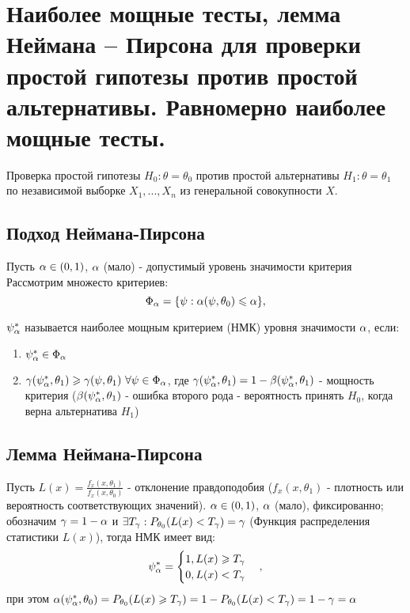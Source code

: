 \section{Наиболее мощные тесты, лемма Неймана – Пирсона для проверки простой гипотезы против простой
альтернативы. Равномерно наиболее мощные тесты.}

Проверка простой гипотезы $H_0 : \theta = \theta_0$ против простой альтернативы $H_1 : \theta = \theta_1$ по независимой выборке $X_1, ..., X_n$ из генеральной совокупности $X$.

\subsection{Подход Неймана-Пирсона}
Пусть $\alpha \in (0, 1)$, $\alpha$ (мало) - допустимый уровень значимости критерия
Рассмотрим множесто критериев:
\[
  \Phi_{\alpha} = \{ \psi : \alpha(\psi, \theta_0) \leqslant \alpha \}\\
,\]

\begin{definition}
  $\psi_{\alpha}^{*}$ называется наиболее мощным критерием (НМК) уровня значимости $\alpha$, если:
  \begin{enumerate}
    \item $\psi_{\alpha}^{*} \in \Phi_{\alpha}$
    \item $\gamma(\psi_{\alpha}^{*}, \theta_1) \geqslant \gamma(\psi, \theta_1)~\forall \psi \in \Phi_{\alpha}$,
      где $\gamma(\psi_{\alpha}^{*}, \theta_1) = 1 - \beta(\psi_{\alpha}^{*}, \theta_1)$ - мощность критерия ($\beta(\psi_{\alpha}^{*}, \theta_1)$ - ошибка второго рода - вероятность принять $H_0$, когда верна альтернатива $H_1$)
  \end{enumerate}
\end{definition}

\subsection{Лемма Неймана-Пирсона}

Пусть $L(x) = \frac{f_x(x, \theta_1)}{f_x(x, \theta_0)}$ - отклонение правдоподобия ($f_x(x, \theta_1)$ - плотность или вероятность соответствующих значений).
$\alpha \in (0, 1)$, $\alpha$ (мало), фиксированно; обозначим $\gamma = 1 - \alpha$ и $\exists T_{\gamma}: P_{\theta_0}(L(x) < T_{\gamma}) = \gamma$ (Функция распределения статистики $L(x)$), тогда НМК имеет вид:
\[
  \psi_{\alpha}^{*} =
  \begin{cases}
    1, L(x) \geqslant T_{\gamma} \\
    0, L(x) < T_{\gamma}
  \end{cases}
,\] 
при этом $\alpha(\psi_{\alpha}^{*}, \theta_0) = P_{\theta_0}(L(x) \geqslant T_{\gamma}) = 1 - P_{\theta_0}(L(x) < T_{\gamma}) = 1 - \gamma = \alpha$

